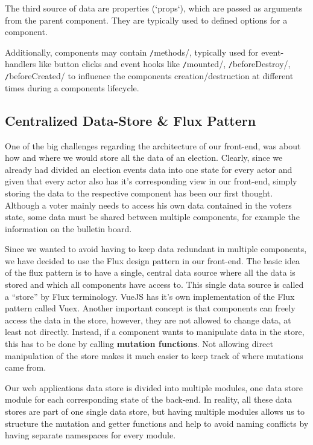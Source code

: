 The third source of data are properties (`props`), which are passed as arguments from the parent component. They are typically used to defined options for a component.

Additionally, components may contain \texttt/methods/, typically used for event-handlers like button clicks and event hooks like \texttt/mounted/, \texttt/beforeDestroy/, \texttt/beforeCreated/ to influence the components creation/destruction at different times during a components lifecycle.

\subsection{Centralized Data-Store \& Flux Pattern}
One of the big challenges regarding the architecture of our front-end, was about how and where we would store all the data of an election. Clearly, since we already had divided an election events data into one state for every actor and given that every actor also has it's corresponding view in our front-end, simply storing the data to the respective component has been our first thought. Although a voter mainly needs to access his own data contained in the voters state, some data must be shared between multiple components, for example the information on the bulletin board.

Since we wanted to avoid having to keep data redundant in multiple components, we have decided to use the Flux design pattern in our front-end. The basic idea of the flux pattern is to have a single, central data source where all the data is stored and which all components have access to. This single data source is called a "`store"' by Flux terminology. VueJS has it's own implementation of the Flux pattern called Vuex. Another important concept is that components can freely access the data in the store, however, they are not allowed to change data, at least not directly. Instead, if a component wants to manipulate data in the store, this has to be done by calling \textbf{mutation functions}. Not allowing direct manipulation of the store makes it much easier to keep track of where mutations came from.

Our web applications data store is divided into multiple modules, one data store module for each corresponding state of the back-end. In reality, all these data stores are part of one single data store, but having multiple modules allows us to structure the mutation and getter functions and help to avoid naming conflicts by having separate namespaces for every module. 

